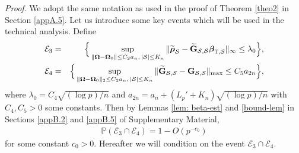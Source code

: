 \documentclass[11pt]{article}
\newcommand{\bG}{\mbox{\bf G}}
\newcommand{\bbeta}{\mbox{\boldmath $\beta$}}
\newcommand{\brho}{\mbox{\boldmath $\rho$}}
\newcommand{\wt}{\widetilde}
\newcommand{\mb}{\mathbb}
\newcommand{\sbOmg}{\mbox{\scriptsize\boldmath $\Omega$}}
\begin{document}
\noindent \textit{Proof}. We adopt the same notation as used in the proof of Theorem \ref{theo2} in Section \ref{appA.5}. Let us introduce some key events which will be used in the technical analysis. Define
		\begin{eqnarray}\label{def: event3}
		\mathcal{E}_3&=&\Big\{\sup_{\|\sbOmg - \sbOmg_0\|\leq C_2a_n, \, |\mathcal{S}|\leq K_n}\|\widetilde{\brho}_{\mathcal{S}}-\widetilde{\bG}_{\mathcal{S},\mathcal{S}}\bbeta_{\mathbb{T}, \mathcal{S}}\|_{\infty}\le \lambda_0\Big\},\\
		\mathcal{E}_4&=&\Big\{\sup_{\|\sbOmg - \sbOmg_0\|_2\leq C_2a_n, \, |\mathcal{S}|\leq K_n}\|\wt{\bG}_{\mathcal{S},\mathcal{S}} - \bG_{\mathcal{S},\mathcal{S}}\|_{\max}\le C_5a_{2n}\Big\},
		\end{eqnarray}
		where  $\lambda_0 = C_4\sqrt{(\log p)/n}$ and $a_{2n} = a_n +( L_{p}' + K_n) \sqrt{(\log p)/n} $ with $C_4, C_5 > 0$ some constants.
		Then by Lemmas \ref{lem: beta-est} and \ref{bound-lem} in Sections \ref{appB.2} and \ref{appB.5} of Supplementary Material,
			\begin{align}\label{eq: event3-prob}
			{\mb P}( \mathcal{E}_3 \cap \mathcal{E}_4) = 1 - O(p^{-c_0})
			\end{align}
for some constant $c_0>0$. Hereafter we will condition on the event $ \mathcal{E}_3 \cap \mathcal{E}_4$.
		
\end{document}
